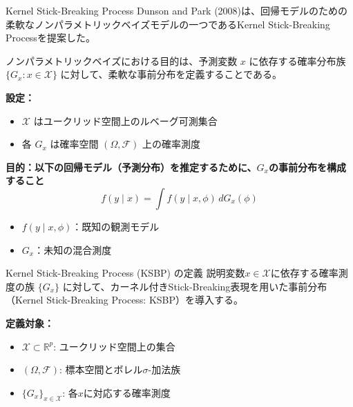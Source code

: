 \documentclass[xelatex, 8pt]{beamer}
\theoremstyle{plain}
\theoremstyle{definition}
\begin{document}
\begin{frame}{Kernel Stick-Breaking Process}
Dunson and Park (2008)\cite{Dunson2008-dg}は、回帰モデルのための柔軟なノンパラメトリックベイズモデルの一つであるKernel Stick-Breaking Processを提案した。

ノンパラメトリックベイズにおける目的は、予測変数 $x$ に依存する確率分布族 $\{G_x : x \in \mathcal{X}\}$ に対して、柔軟な事前分布を定義することである。

\vspace{1em}
\textbf{設定：}
\begin{itemize}
    \item $\mathcal{X}$ はユークリッド空間上のルベーグ可測集合
    \item 各 $G_x$ は確率空間 $(\Omega, \mathcal{F})$ 上の確率測度
\end{itemize}

\vspace{1em}
\textbf{目的：以下の回帰モデル（予測分布）を推定するために、$G_x$の事前分布を構成すること}
\[
f(y \mid x) = \int f(y \mid x, \phi) \, dG_x(\phi)
\]
\begin{itemize}
    \item $f(y \mid x, \phi)$：既知の観測モデル
    \item $G_x$：未知の混合測度
\end{itemize}

\end{frame}

\begin{frame}{Kernel Stick-Breaking Process (KSBP) の定義}
説明変数$x \in \mathcal{X}$に依存する確率測度の族 $\{G_x\}$ に対して、カーネル付きStick-Breaking表現を用いた事前分布（Kernel Stick-Breaking Process: KSBP）を導入する。

\vspace{1em}
\textbf{定義対象：}
\begin{itemize}
    \item $\mathcal{X} \subset \mathbb{R}^p$: ユークリッド空間上の集合
    \item $(\Omega, \mathcal{F})$: 標本空間とボレル$\sigma$-加法族
    \item $\{G_x\}_{x \in \mathcal{X}}$: 各$x$に対応する確率測度
\end{itemize}

\end{frame}
\end{document}
